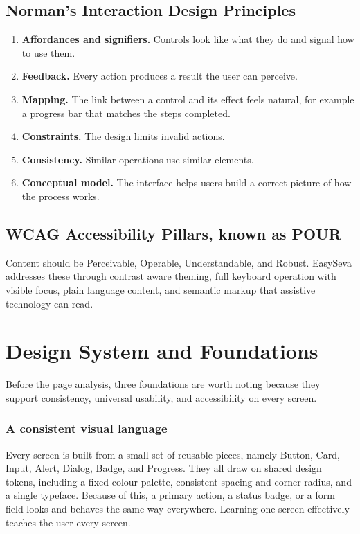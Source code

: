 \documentclass[12pt,a4paper]{article}
\begin{document}
\subsection{Norman's Interaction Design Principles}
\begin{enumerate}[label=D\arabic*.]
  \item \textbf{Affordances and signifiers.} Controls look like what they do and
        signal how to use them.
  \item \textbf{Feedback.} Every action produces a result the user can perceive.
  \item \textbf{Mapping.} The link between a control and its effect feels natural,
        for example a progress bar that matches the steps completed.
  \item \textbf{Constraints.} The design limits invalid actions.
  \item \textbf{Consistency.} Similar operations use similar elements.
  \item \textbf{Conceptual model.} The interface helps users build a correct
        picture of how the process works.
\end{enumerate}

\subsection{WCAG Accessibility Pillars, known as POUR}
Content should be Perceivable, Operable, Understandable, and Robust. EasySeva
addresses these through contrast aware theming, full keyboard operation with
visible focus, plain language content, and semantic markup that assistive
technology can read.

\section{Design System and Foundations}
Before the page analysis, three foundations are worth noting because they support
consistency, universal usability, and accessibility on every screen.

\subsubsection{A consistent visual language}
Every screen is built from a small set of reusable pieces, namely Button, Card,
Input, Alert, Dialog, Badge, and Progress. They all draw on shared design tokens,
including a fixed colour palette, consistent spacing and corner radius, and a
single typeface. Because of this, a primary action, a status badge, or a form
field looks and behaves the same way everywhere. Learning one screen effectively
teaches the user every screen.
\end{document}
